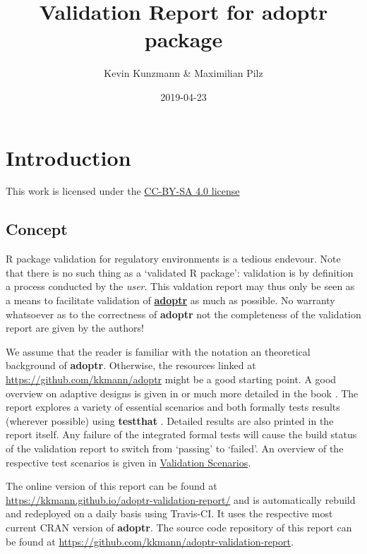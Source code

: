 \documentclass[]{book}
\title{Validation Report for \textbf{adoptr} package}
\author{Kevin Kunzmann \& Maximilian Pilz}
\date{2019-04-23}
\begin{document}
\maketitle

{
\setcounter{tocdepth}{1}
\tableofcontents
}
\hypertarget{introduction}{%
\chapter{Introduction}\label{introduction}}

This work is licensed under the \href{https://creativecommons.org/licenses/by-sa/4.0/deed.en}{CC-BY-SA 4.0 license}

\hypertarget{concept}{%
\section{Concept}\label{concept}}

R package validation for regulatory environments is a tedious endevour.
Note that there is no such thing as a `validated R package':
validation is by definition a process conducted by the \emph{user}.
This valdation report may thus only be seen as a means to facilitate
validation of \textbf{\href{https://github.com/kkmann/adoptr}{adoptr}} as much as possible.
No warranty whatsoever as to the correctness of \textbf{adoptr} not the
completeness of the validation report are given by the authors!

We assume that the reader is familiar with the notation an theoretical
background of \textbf{adoptr}.
Otherwise, the resources linked at \url{https://github.com/kkmann/adoptr} might
be a good starting point.
A good overview on adaptive designs is given in \citep{Bauer2015} or much more
detailed in the book \citep{Wassmer2016}.
The report explores a variety of essential scenarios and both formally
tests results (wherever possible) using \textbf{testthat} \citep{R-testthat}.
Detailed results are also printed in the report itself.
Any failure of the integrated formal tests will cause the build status
of the validation report to switch from `passing' to `failed'.
An overview of the respective test scenarios is given in \protect\hyperlink{validation-scenarios}{Validation Scenarios}.

The online version of this report can be found at
\url{https://kkmann.github.io/adoptr-validation-report/} and is automatically
rebuild and redeployed on a daily basis using Travis-CI.
It uses the respective most current CRAN version of \textbf{adoptr}.
The source code repository of this report can be found at
\url{https://github.com/kkmann/adoptr-validation-report}.
\end{document}
